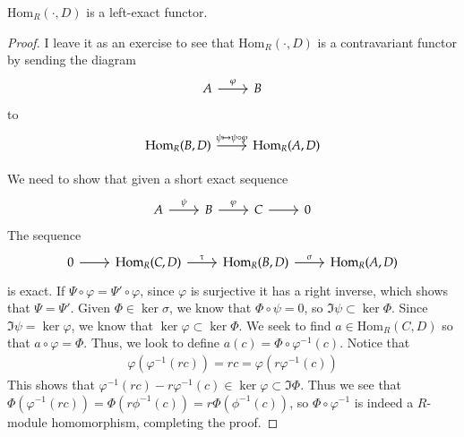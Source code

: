 \documentclass[12pt]{article}
\newenvironment{theorem}{\begin{mytheorem}}{\end{mytheorem}}
\theoremstyle{definitionstyle}
\def\cph{\varphi}
\newcommand{\Hom}{\mathrm{Hom}}
\begin{document}
    \newpage
        \begin{theorem}
            $\Hom_R(\cdot, D)$ is a left-exact functor.
        \end{theorem}
        \begin{proof}
            I leave it as an exercise to see that $\Hom_R(\cdot, D)$ is a contravariant functor by sending the diagram
            \[\begin{tikzcd}
                A & B
                \arrow["\varphi", from=1-1, to=1-2]
            \end{tikzcd}\]
            to 
            \[\begin{tikzcd}
                {\Hom_R(B, D)} & {\Hom_R(A,D)}
                \arrow["{\psi \mapsto \psi \circ \varphi}", from=1-1, to=1-2]
            \end{tikzcd}\]

            We need to show that given a short exact sequence 
            \[\begin{tikzcd}
                A & B & C & 0
                \arrow["\psi", from=1-1, to=1-2]
                \arrow["\varphi", from=1-2, to=1-3]
                \arrow[from=1-3, to=1-4]
            \end{tikzcd}\]
            The sequence
            \[\begin{tikzcd}
                0 & {\Hom_R(C,D) } & {\Hom_R(B, D)} & {\Hom_R(A, D)}
                \arrow[from=1-1, to=1-2]
                \arrow["\tau", from=1-2, to=1-3]
                \arrow["\sigma", from=1-3, to=1-4]
            \end{tikzcd}\]
            is exact. If $\Psi \circ \varphi = \Psi' \circ \varphi$, since $\varphi$ is surjective it has a right inverse, which shows that $\Psi = \Psi'$. Given $\Phi \in \ker \sigma$, we know that $\Phi \circ \psi = 0$, so $\Im \psi \subset \ker \Phi$. Since $\Im \psi = \ker \cph$, we know that $\ker \cph \subset \ker \Phi$. We seek to find $a \in \Hom_R(C,D)$ so that $a \circ \cph = \Phi$. Thus, we look to define $a(c) = \Phi \circ \cph^{-1}(c)$. Notice that 
            \begin{align*}
                \cph(\cph^{-1}(rc)) = rc = \cph(r\cph^{-1}(c))
            \end{align*}
            This shows that $\cph^{-1}(rc) - r\cph^{-1}(c) \in \ker \cph \subset \Im \Phi$. Thus we see that $\Phi(\cph^{-1}(rc)) = \Phi(r\phi^{-1}(c)) = r\Phi(\phi^{-1}(c))$, so $\Phi \circ \cph^{-1}$ is indeed a $R$-module homomorphism, completing the proof.
        \end{proof}
\end{document}
